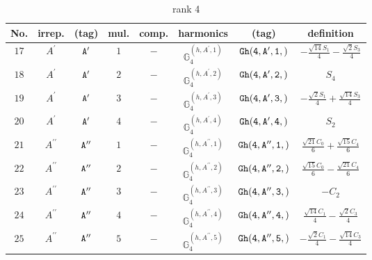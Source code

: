 \documentclass[fleqn,8pt]{jsarticle}
\begin{document}
\begin{table}[ht!]
\begin{center}
\caption{rank 4}
\renewcommand{\arraystretch}{1.3}
\begin{tabular}{cccccccc} \hline \hline
No. & irrep. & (tag) & mul. & comp. & harmonics & (tag) & definition \\ \hline
$ 17 $ & $ A^{\prime} $ & $ {\tt A'} $ & $ 1 $ & $ - $ & $ \mathbb{G}_{4}^{(h,A^{\prime},1)} $ & $ {\tt Gh(4,A',1,)} $ & $ - \frac{\sqrt{14} S_{1}}{4} - \frac{\sqrt{2} S_{3}}{4} $ \\
$ 18 $ & $ A^{\prime} $ & $ {\tt A'} $ & $ 2 $ & $ - $ & $ \mathbb{G}_{4}^{(h,A^{\prime},2)} $ & $ {\tt Gh(4,A',2,)} $ & $ S_{4} $ \\
$ 19 $ & $ A^{\prime} $ & $ {\tt A'} $ & $ 3 $ & $ - $ & $ \mathbb{G}_{4}^{(h,A^{\prime},3)} $ & $ {\tt Gh(4,A',3,)} $ & $ - \frac{\sqrt{2} S_{1}}{4} + \frac{\sqrt{14} S_{3}}{4} $ \\
$ 20 $ & $ A^{\prime} $ & $ {\tt A'} $ & $ 4 $ & $ - $ & $ \mathbb{G}_{4}^{(h,A^{\prime},4)} $ & $ {\tt Gh(4,A',4,)} $ & $ S_{2} $ \\
$ 21 $ & $ A^{\prime\prime} $ & $ {\tt A''} $ & $ 1 $ & $ - $ & $ \mathbb{G}_{4}^{(h,A^{\prime\prime},1)} $ & $ {\tt Gh(4,A'',1,)} $ & $ \frac{\sqrt{21} C_{0}}{6} + \frac{\sqrt{15} C_{4}}{6} $ \\
$ 22 $ & $ A^{\prime\prime} $ & $ {\tt A''} $ & $ 2 $ & $ - $ & $ \mathbb{G}_{4}^{(h,A^{\prime\prime},2)} $ & $ {\tt Gh(4,A'',2,)} $ & $ \frac{\sqrt{15} C_{0}}{6} - \frac{\sqrt{21} C_{4}}{6} $ \\
$ 23 $ & $ A^{\prime\prime} $ & $ {\tt A''} $ & $ 3 $ & $ - $ & $ \mathbb{G}_{4}^{(h,A^{\prime\prime},3)} $ & $ {\tt Gh(4,A'',3,)} $ & $ - C_{2} $ \\
$ 24 $ & $ A^{\prime\prime} $ & $ {\tt A''} $ & $ 4 $ & $ - $ & $ \mathbb{G}_{4}^{(h,A^{\prime\prime},4)} $ & $ {\tt Gh(4,A'',4,)} $ & $ \frac{\sqrt{14} C_{1}}{4} - \frac{\sqrt{2} C_{3}}{4} $ \\
$ 25 $ & $ A^{\prime\prime} $ & $ {\tt A''} $ & $ 5 $ & $ - $ & $ \mathbb{G}_{4}^{(h,A^{\prime\prime},5)} $ & $ {\tt Gh(4,A'',5,)} $ & $ - \frac{\sqrt{2} C_{1}}{4} - \frac{\sqrt{14} C_{3}}{4} $ \\
 \hline \hline
\end{tabular}
\end{center}
\end{table}
\end{document}
